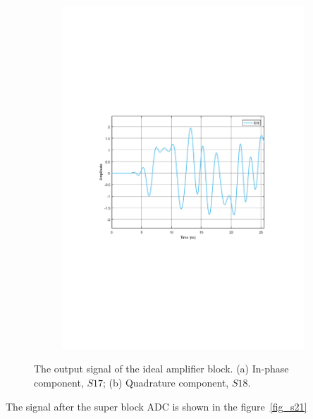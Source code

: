 \begin{refsection}
\begin{figure}[h!]
\begin{subfigure}{.5\textwidth}
  \includegraphics[width=\linewidth]{./sdf/dsp_laser_phase_compensation/figures/S18_td.pdf}
  \caption{}
  \label{fig:sub2}
\end{subfigure}
\caption{The output signal of the ideal amplifier block. (a) In-phase component, $S17$; (b)  Quadrature component, $S18$.}
\label{fig_s17_18}
\end{figure}


The signal after the super block ADC is shown in the figure~\ref{fig_s21}



\end{refsection}
